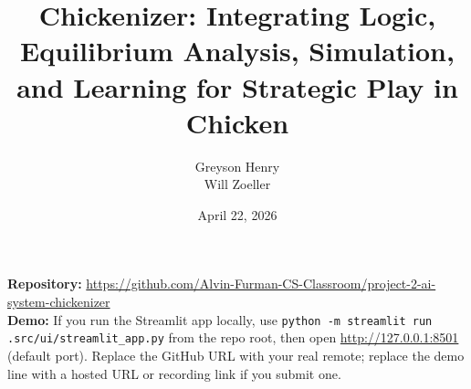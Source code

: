 \documentclass[11pt]{article}
\title{Chickenizer: Integrating Logic, Equilibrium Analysis, Simulation, and Learning for Strategic Play in Chicken}
\author{Greyson Henry\\Will Zoeller}
\date{April 22, 2026}
\begin{document}
\maketitle
{\small
\noindent\textbf{Repository:} \url{https://github.com/Alvin-Furman-CS-Classroom/project-2-ai-system-chickenizer}\\
\textbf{Demo:} If you run the Streamlit app locally, use \texttt{python -m streamlit run .src/ui/streamlit\_app.py} from the repo root, then open \url{http://127.0.0.1:8501} (default port). Replace the GitHub URL with your real remote; replace the demo line with a hosted URL or recording link if you submit one.
\par\vspace{0.6em}}
\pagestyle{plain}














\end{document}

